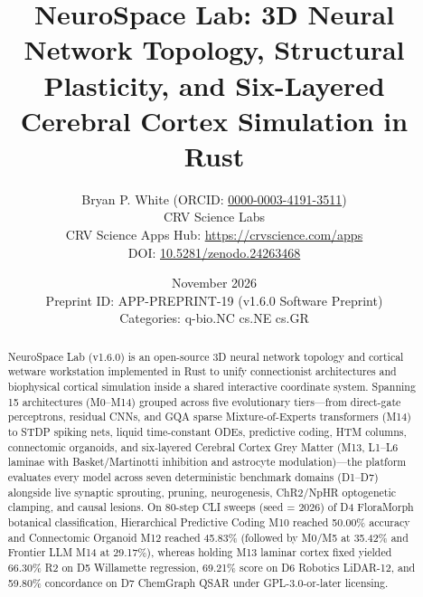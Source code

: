 \documentclass[10pt,letterpaper]{article}
\title{\textbf{NeuroSpace Lab: 3D Neural Network Topology, Structural Plasticity, and Six-Layered Cerebral Cortex Simulation in Rust}}
\author{Bryan P. White (ORCID: \href{https://orcid.org/0000-0003-4191-3511}{0000-0003-4191-3511}) \\ CRV Science Labs \\ \small CRV Science Apps Hub: \url{https://crvscience.com/apps} \\ \small DOI: \href{https://doi.org/10.5281/zenodo.24263468}{10.5281/zenodo.24263468}}
\date{November 2026 \\ \small Preprint ID: APP-PREPRINT-19 (v1.6.0 Software Preprint) \\ \small Categories: q-bio.NC \textbullet{} cs.NE \textbullet{} cs.GR}
\begin{document}
\maketitle

\begin{abstract}
NeuroSpace Lab (v1.6.0) is an open-source 3D neural network topology and cortical wetware workstation implemented in Rust to unify connectionist architectures and biophysical cortical simulation inside a shared interactive coordinate system. Spanning 15 architectures (M0--M14) grouped across five evolutionary tiers---from direct-gate perceptrons, residual CNNs, and GQA sparse Mixture-of-Experts transformers (M14) to STDP spiking nets, liquid time-constant ODEs, predictive coding, HTM columns, connectomic organoids, and six-layered Cerebral Cortex Grey Matter (M13, L1--L6 laminae with Basket/Martinotti inhibition and astrocyte modulation)---the platform evaluates every model across seven deterministic benchmark domains (D1--D7) alongside live synaptic sprouting, pruning, neurogenesis, ChR2/NpHR optogenetic clamping, and causal lesions. On 80-step CLI sweeps (seed = 2026) of D4 FloraMorph botanical classification, Hierarchical Predictive Coding M10 reached 50.00\% accuracy and Connectomic Organoid M12 reached 45.83\% (followed by M0/M5 at 35.42\% and Frontier LLM M14 at 29.17\%), whereas holding M13 laminar cortex fixed yielded 66.30\% R2 on D5 Willamette regression, 69.21\% score on D6 Robotics LiDAR-12, and 59.80\% concordance on D7 ChemGraph QSAR under GPL-3.0-or-later licensing.
\end{abstract}
\end{document}
